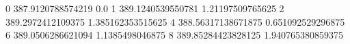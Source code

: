 0 387.9120788574219 0.0
1 389.1240539550781 1.21197509765625
2 389.2972412109375 1.385162353515625
4 388.56317138671875 0.651092529296875
6 389.0506286621094 1.1385498046875
8 389.85284423828125 1.940765380859375
